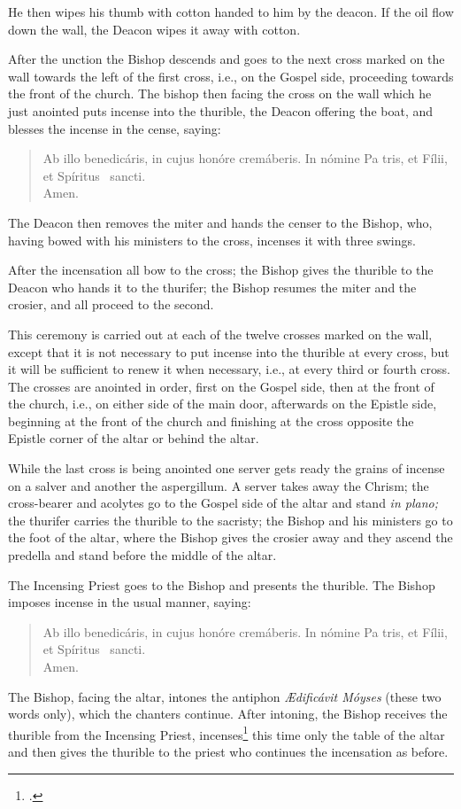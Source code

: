\documentclass[letterpaper]{report}
\newcommand\blessincense{
\begin{quote}
   Ab illo benedicáris, in cujus honóre cremáberis. In nómine Pa\cross
    tris, et Fí\cross lii, et Spíritus \cross\ sancti. \\ \rbar Amen.
\end{quote}
}
\begin{document}
{    He then wipes his thumb with cotton handed to him by the deacon. If the oil
    flow down the wall, the Deacon wipes it away with cotton.

    \rubric After the unction the Bishop descends and goes to the next cross
    marked on the wall towards the left of the first cross, i.e., on the
    Gospel side, proceeding towards the front of the church. The bishop then
    facing the cross on the wall which he just anointed puts incense into the
    thurible, the Deacon offering the boat, and blesses the incense in the
    cense, saying: 

    \blessincense

    The Deacon then removes the miter and hands the censer to the Bishop, who,
    having bowed with his ministers to the cross, incenses it with three
    swings.

    After the incensation all bow to the cross; the Bishop gives the thurible
    to the Deacon who hands it to the thurifer; the Bishop resumes the miter
    and the crosier, and all proceed to the second. 
    
    \rubric This ceremony is carried out at each of the twelve crosses marked
    on the wall, except that it is not necessary to put incense into the
    thurible at every cross, but it will be sufficient to renew it when
    necessary, i.e., at every third or fourth cross. The crosses are anointed
    in order, first on the Gospel side, then at the front of the church, i.e.,
    on either side of the main door, afterwards on the Epistle side, beginning
    at the front of the church and finishing at the cross opposite the Epistle
    corner of the altar or behind the altar.

    \rubric While the last cross is being anointed one server gets ready the
    grains of incense on a salver and another the aspergillum. A server takes
    away the Chrism; the cross-bearer and acolytes go to the Gospel side of
    the altar and stand \textit{in plano;} the thurifer carries the thurible to
    the sacristy; the Bishop and his ministers go to the foot of the altar,
    where the Bishop gives the crosier away and they ascend the predella and
    stand before the middle of the altar.

    \rubric The Incensing Priest goes to the Bishop and presents the thurible.
    The Bishop imposes incense in the usual manner, saying:

    \blessincense

    The Bishop, facing the altar, intones the antiphon \textit{\AE dificávit
    Móyses} (these two words only), which the chanters continue. After
    intoning, the Bishop receives the thurible from the Incensing Priest,
    incenses\footcite[ It seems that a single swing to the middle, one to the
    left, and one to the right suffices. ][]{consecranda:1956} this time only
    the table of the altar and then gives the thurible to the priest who
    continues the incensation as before.

}
\end{document}
